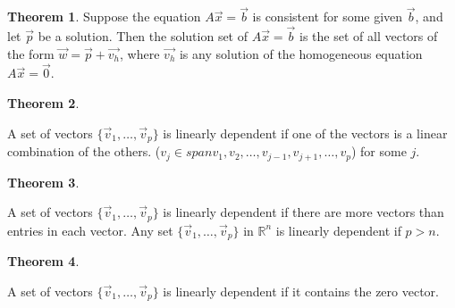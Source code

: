 \documentclass[a4paper,12pt]{article}
\theoremstyle{definition}
\newtheorem{theorem}{Theorem}
\theoremstyle{definition}
\newcommand{\finitevecs}[2]{#1_1,\ldots,#1_#2}
\newcommand{\finitevecsset}[2]{\{\finitevecs{#1}{#2}\}}
\begin{document}
	\begin{theorem}
		\label{thm:non-homo-thm}
		Suppose the equation $A\vec{x} = \vec{b}$ is consistent for some given $\vec{b}$, and let $\vec{p}$ be a
		solution. Then the solution set of $A\vec{x} = \vec{b}$ is the set of all vectors of the form
		$\vec{w} = \vec{p} + \vec{v_h}$, where $\vec{v_h}$ is any solution of the homogeneous equation $A\vec{x} = \vec{0}$.
	\end{theorem}
	
	\begin{theorem}
		\label{thm:lin-dep-thm}
		
		A set of vectors $\finitevecsset{\vec{v}}{p}$ is linearly dependent if one of the vectors is a linear combination of the others. ($v_j \in span{v_1, v_2,\ldots,v_{j-1}, v_{j+1},\ldots,v_p}$) for some $j$.
	\end{theorem}
	
	\begin{theorem}
		\label{thm:lin-dep-thm-p-gt-n}
		
		A set of vectors $\finitevecsset{\vec{v}}{p}$ is linearly dependent if there are more vectors than entries in each vector. Any set $\finitevecsset{\vec{v}}{p}$ in $\mathbb{R}^n$ is linearly dependent if $p > n$.
	\end{theorem}
	
	\begin{theorem}
		\label{thm:lin-dep-thm-zero-vec}
		
		A set of vectors $\finitevecsset{\vec{v}}{p}$ is linearly dependent if it contains the zero vector.
	\end{theorem}
	
\end{document}
